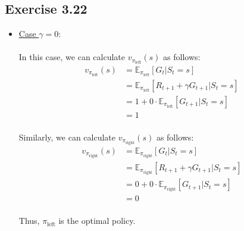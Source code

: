\documentclass{article}
\begin{document}
\subsection*{Exercise 3.22}
\begin{itemize}
    \item \underline{Case $\gamma=0$}:\\\\
    In this case, we can calculate $v_{\pi_{\text{left}}}(s)$ as follows:
    \begin{equation*}
        \begin{aligned}
            v_{\pi_{\text{left}}}(s) &= \mathbb{E}_{\pi_{\text{left}}}[G_t | S_t=s]\\
            &= \mathbb{E}_{\pi_{\text{left}}}[R_{t+1} + \gamma G_{t+1} | S_t=s]\\
            &= 1 + 0\cdot \mathbb{E}_{\pi_{\text{left}}}[G_{t+1} | S_t=s]\\
            &= 1\\
        \end{aligned}
    \end{equation*}\par
    Similarly, we can calculate $v_{\pi_{\text{right}}}(s)$ as follows:
    \begin{equation*}
        \begin{aligned}
            v_{\pi_{\text{right}}}(s) &= \mathbb{E}_{\pi_{\text{right}}}[G_t | S_t=s]\\
            &= \mathbb{E}_{\pi_{\text{right}}}[R_{t+1} + \gamma G_{t+1} | S_t=s]\\
            &= 0 + 0\cdot \mathbb{E}_{\pi_{\text{right}}}[G_{t+1} | S_t=s]\\
            &= 0\\
        \end{aligned}
    \end{equation*}\par 
    Thus, $\pi_{\text{left}}$ is the optimal policy.\\\\


\end{itemize}
\end{document}
